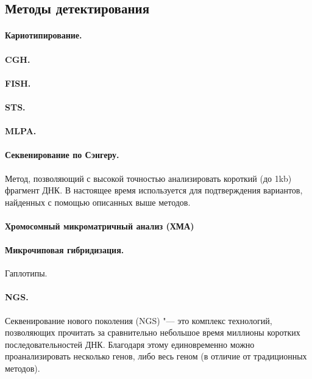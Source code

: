 \documentclass[a4paper,12pt]{article}
\begin{document}
\subsection{Методы детектирования}

\paragraph{Кариотипирование.}

\paragraph{CGH.}

\paragraph{FISH.}

\paragraph{STS.}

\paragraph{MLPA.}

\paragraph{Секвенирование по Сэнгеру.}
Метод, позволяющий с высокой точностью анализировать короткий (до 1kb) фрагмент ДНК\cite{sanger}.
В настоящее время используется для подтверждения вариантов, найденных с помощью описанных выше методов.

\paragraph{Хромосомный микроматричный анализ (ХМА)}

\paragraph{Микрочиповая гибридизация.}
Гаплотипы.

\paragraph{NGS.}
Секвенирование нового поколения (NGS) "--- это комплекс технологий, позволяющих прочитать за сравнительно небольшое время миллионы коротких последовательностей ДНК.
Благодаря этому единовременно можно проанализировать несколько генов, либо весь геном (в отличие от традиционных методов).
\end{document}
